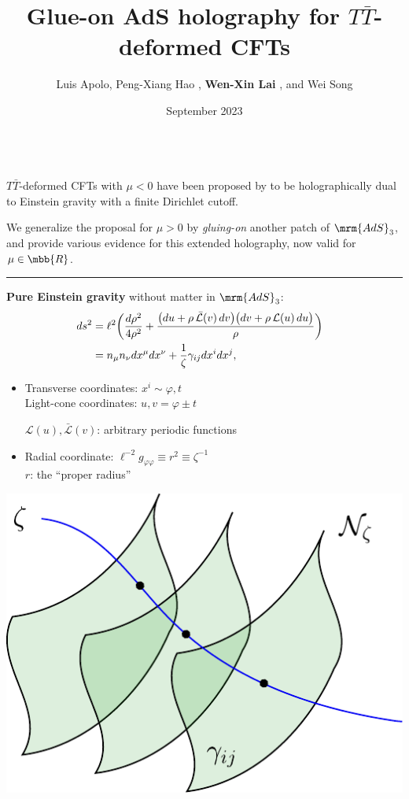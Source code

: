\documentclass[10pt]{article}
\title{Glue-on AdS holography for $T\bar T$-deformed CFTs}
\author{%
	Luis Apolo,
	Peng-Xiang Hao \textkai{\normalsize 郝鹏翔},
	\textbf{Wen-Xin Lai \textkai{\small 赖文昕}},
	and Wei Song \textkai{\small 宋伟}
}
\date{September 2023}
\newcommand{\TTbar}{\texorpdfstring{\ensuremath{T\bar{T}}}{TTbar}\xspace}
\begin{document}
\maketitle
\thispagestyle{empty}


\begin{multicols}{3}

\,\\[-2.2\baselineskip]

\TTbar-deformed CFTs with $\mu < 0$ have been proposed by \mbox{\textcite{McGough:2016lol}} to be holographically dual to Einstein gravity with a finite \mbox{Dirichlet} cutoff.

We generalize the proposal for $\mu > 0$ by \textit{gluing-on} another patch of $\mrm{AdS}_3$, and \mbox{provide} various evidence for this extended holography, now valid for $\mu \in \mbb{R}$.

\vspace{.8\baselineskip}
\hrule
\vspace{.3\baselineskip}

\textbf{Pure Einstein gravity} without matter in $\mrm{AdS}_3$:
\begin{align}
\hspace{-.8em}
	ds^2
	&= \ell^2 \bigg( \frac{d\rho^2}{4 \rho^2} + \frac{ \big( du + \rho \, \mathcal {\bar L}(v)\, dv \big) \big( dv + \rho \, \mathcal L(u)\, du \big) }{\rho} \bigg) \notag\\
	&= n_\mu n_\nu dx^\mu dx^\nu + \frac{1}{\zeta} \gamma_{ij}dx^i dx^j, \label{fggauge}
\end{align}

\begin{itemize}
\item Transverse coordinates: $x^{i} \sim \varphi, t$ \\
	Light-cone coordinates: $u,v = \varphi \pm t$

	$\mathcal L(u), \bar{\mathcal L}(v)$: arbitrary periodic functions
\item Radial coordinate: $
	\ell^{-2} g_{\varphi\varphi} \equiv r^2 \equiv \zeta^{-1}$\\
	$r$: the ``proper radius''
\end{itemize}
\begin{center}
	\vspace{-.5\baselineskip}
	\includegraphics[width=.52\linewidth]{img/foliation.pdf}
	

\end{center}
\end{multicols}
\end{document}
